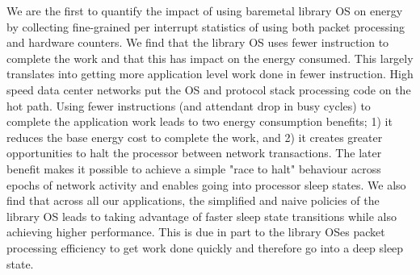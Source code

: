We are the first to quantify the impact of using baremetal library OS on energy by collecting fine-grained per interrupt statistics of using both packet processing and hardware counters.  We find that the library OS uses fewer instruction to complete the work and that this has impact on the energy consumed.  This largely translates into getting more application level work done in fewer instruction.  High speed data center networks put the OS and protocol stack processing code on the hot path. Using fewer instructions (and attendant drop in busy cycles) to complete the application work leads to two energy consumption benefits; 1) it reduces the base energy cost to complete the work, and 2) it creates greater opportunities to halt the processor between network transactions.  The later benefit makes it possible to achieve a simple "race to halt" behaviour across epochs of network activity and enables going into processor sleep states. We also find that across all our applications, the simplified and naive policies of the library OS leads to taking advantage of faster sleep state transitions while also achieving higher performance. This is due in part to the library OSes packet processing efficiency to get work done quickly and therefore go into a deep sleep state.


